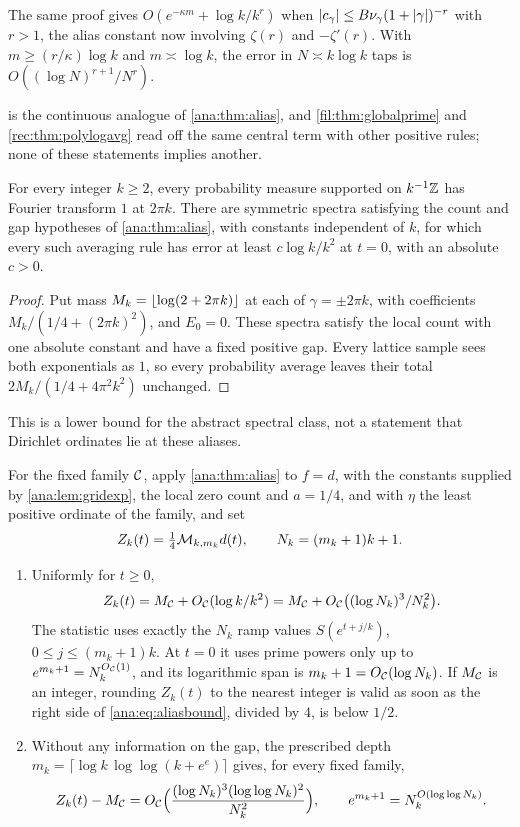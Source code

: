 The same proof gives $O(e^{-\kappa m}+\log k/k^r)$ when
$\lvert c_\gamma\rvert\le B\nu_\gamma(1+\lvert\gamma\rvert)^{-r}$ with $r>1$, the alias constant now involving
$\zeta(r)$ and $-\zeta'(r)$. With $m\ge(r/\kappa)\log k$ and $m\asymp\log k$, the error in
$N\asymp k\log k$ taps is $O((\log N)^{r+1}/N^r)$.

 is the continuous analogue of \cref{ana:thm:alias}, and \cref{fil:thm:globalprime} and
\cref{rec:thm:polylogavg} read off the same central term with other positive rules; none of these statements
implies another.

\begin{proposition}\label{ana:prop:alias}
For every integer $k\ge2$, every probability measure supported on $k^{-1}\mathbb{Z}$ has Fourier
transform $1$ at $2\pi k$. There are symmetric spectra satisfying the count and gap hypotheses
of \cref{ana:thm:alias}, with constants independent of $k$, for which every such averaging rule
has error at least $c\log k/k^2$ at $t=0$, with an absolute $c>0$.
\end{proposition}

\begin{proof}
Put mass $M_k=\lfloor\log(2+2\pi k)\rfloor$ at each of $\gamma=\pm2\pi k$, with coefficients
$M_k/(1/4+(2\pi k)^2)$, and $E_0=0$. These spectra satisfy the local count with one absolute
constant and have a fixed positive gap. Every lattice sample sees both exponentials as $1$, so
every probability average leaves their total $2M_k/(1/4+4\pi^2k^2)$ unchanged.
\end{proof}

This is a lower bound for the abstract spectral class, not a statement that Dirichlet ordinates
lie at these aliases.

\begin{theorem}\label{ana:thm:grid}
For the fixed family $\mathcal{C}$, apply \cref{ana:thm:alias} to $f=d$, with the constants supplied
by \cref{ana:lem:gridexp}, the local zero count and $a=1/4$, and with
$\eta$ the least positive ordinate of the family, and set
\[
 Z_k(t)=\tfrac14\mathcal{M}_{k,m_k}d(t),\qquad N_k=(m_k+1)k+1 .
\]
\begin{enumerate}[label=\textup{(\roman*)}]
\item Uniformly for $t\ge0$,
 \[
  Z_k(t)=M_{\mathcal{C}}+O_{\mathcal{C}}(\log k/k^2)=M_{\mathcal{C}}+O_{\mathcal{C}}\bigl((\log N_k)^3/N_k^2\bigr).
 \]
 The statistic uses exactly the $N_k$ ramp values $S(e^{t+j/k})$, $0\le j\le(m_k+1)k$. At $t=0$
 it uses prime powers only up to $e^{m_k+1}=N_k^{O_{\mathcal{C}}(1)}$, and its logarithmic span is
 $m_k+1=O_{\mathcal{C}}(\log N_k)$. If $M_{\mathcal{C}}$ is an integer, rounding $Z_k(t)$ to the nearest
 integer is valid as soon as the right side of
 \eqref{ana:eq:aliasbound}, divided by $4$, is below $1/2$.
\item Without any information on the gap, the prescribed depth
 $m_k=\lceil\log k\,\log\log(k+e^e)\rceil$ gives, for every fixed family,
 \[
  Z_k(t)-M_{\mathcal{C}}=O_{\mathcal{C}}\Bigl(\frac{(\log N_k)^3(\log\log N_k)^2}{N_k^2}\Bigr),\qquad
  e^{m_k+1}=N_k^{O(\log\log N_k)} .
 \]
\end{enumerate}
\end{theorem}

